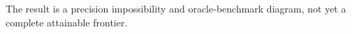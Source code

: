 The result is a precision impossibility and oracle-benchmark diagram, not yet a complete attainable frontier.